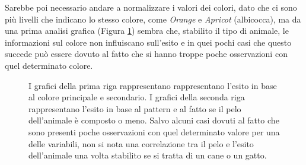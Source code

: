 Sarebbe poi necessario andare a normalizzare i valori dei colori, dato che ci sono più livelli che indicano lo stesso colore, come \textit{Orange} e \textit{Apricot} (albicocca), ma da una prima analisi grafica (Figura \ref{fig-colors}) sembra che, stabilito il tipo di animale, le informazioni sul colore non influiscano sull'esito e in quei pochi casi che questo succede può essere dovuto al fatto che si hanno troppe poche osservazioni con quel determinato colore.

\begin{figure}[!ht]
	\centering
	\quad
	
	\quad
	\caption{I grafici della prima riga rappresentano rappresentano l'esito in base al colore principale e secondario. I grafici della seconda riga rappresentano l'esito in base al pattern e al fatto se il pelo dell'animale è composto o meno. Salvo alcuni casi dovuti al fatto che sono presenti poche osservazioni con quel determinato valore per una delle variabili, non si nota una correlazione tra il pelo e l'esito dell'animale una volta stabilito se si tratta di un cane o un gatto.}
	\label{fig-colors}
\end{figure}

